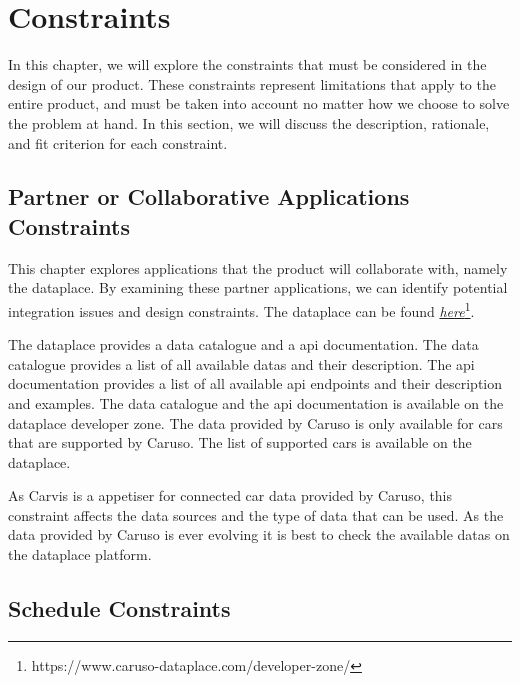 \chapter{Constraints}

In this chapter, we will explore the constraints that must be considered in the design of our product. These constraints represent limitations that apply to the entire product, and must be taken into account no matter how we choose to solve the problem at hand. In this section, we will discuss the description, rationale, and fit criterion for each constraint.

\section{Partner or Collaborative Applications Constraints}

This chapter explores applications that the product will collaborate with, namely the \gls{dataplace}. By examining these partner applications, we can identify potential integration issues and design constraints. The dataplace can be found \href{https://www.caruso-dataplace.com/developer-zone/}{\emph{here}}\footnote{https://www.caruso-dataplace.com/developer-zone/}.

The \gls{dataplace} provides a data catalogue and a \gls{api} documentation. The data catalogue provides a list of all available \glspl{data} and their description. The \gls{api} documentation provides a list of all available \gls{api} endpoints and their description and examples. The data catalogue and the \gls{api} documentation is available on the \gls{dataplace} developer zone. The data provided by Caruso is only available for cars that are supported by Caruso. The list of supported cars is available on the \gls{dataplace}.

As Carvis is a \gls{appetiser} for connected car data provided by Caruso, this constraint affects the data sources and the type of data that can be used. As the data provided by Caruso is ever evolving it is best to check the available \glspl{data} on the \gls{dataplace} platform. 

\section{Schedule Constraints}

